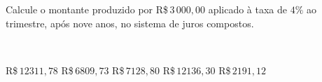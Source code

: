 \parbox{\linewidth}{

Calcule o montante produzido por R\$\,$3\,000{,}00$ aplicado à taxa de $4\%$ ao trimestre, após nove anos, no sistema de juros compostos.}\vspace{2mm}\\\parbox{\linewidth}{

R\$\,$  12311{,}78$
R\$\,$   6809{,}73$
R\$\,$   7128{,}80$
R\$\,$  12136{,}30$
R\$\,$   2191{,}12$

}


